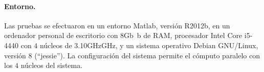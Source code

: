 \paragraph{Entorno.}
Las pruebas se efectuaron en un entorno Matlab, versión R2012b, en un
ordenador personal de escritorio con $8$\iflatexml{}Gb\else\si{\giga
  b}\fi{} de RAM, procesador Intel Core i5-4440 con $4$ núcleos de
3.10\iflatexml{}GHz\else\si{\giga Hz}\fi{}, y un sistema operativo
Debian GNU/Linux, versión $8$ (``jessie'').
La configuración del sistema permite el cómputo paralelo con los $4$
núcleos del sistema.
